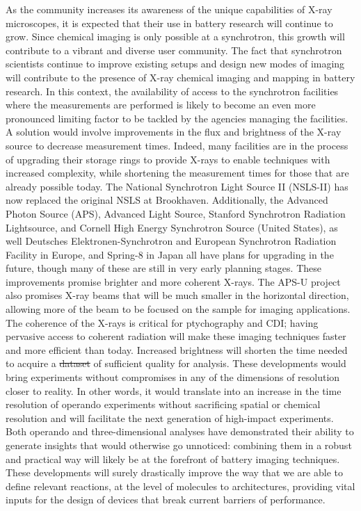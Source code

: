 \documentclass[journal=cmatex,manuscript=perspective]{achemso}
\providecommand{\DIFaddtex}[1]{{\protect\color{blue}\uwave{#1}}} %
\providecommand{\DIFdeltex}[1]{{\protect\color{red}\sout{#1}}}                      %
\providecommand{\DIFaddbegin}{} %
\providecommand{\DIFaddend}{} %
\providecommand{\DIFdelbegin}{} %
\providecommand{\DIFdelend}{} %
\providecommand{\DIFadd}[1]{\texorpdfstring{\DIFaddtex{#1}}{#1}} %
\providecommand{\DIFdel}[1]{\texorpdfstring{\DIFdeltex{#1}}{}} %
\begin{document}
As the community increases its awareness of the unique capabilities of
X-ray microscopes, it is expected that their use in battery research
will continue to grow. Since chemical imaging is only possible at a
synchrotron, this growth will contribute to a vibrant and diverse user
community. The fact that synchrotron scientists continue to improve
existing setups and design new modes of imaging will contribute to the
presence of X-ray chemical imaging and mapping in battery research. In
this context, the availability of access to the synchrotron facilities
where the measurements are performed is likely to become an even more
pronounced limiting factor to be tackled by the agencies managing the
facilities. A solution would involve improvements in the flux and
brightness of the X-ray source to decrease measurement times. Indeed,
many facilities are in the process of upgrading their storage rings to
provide X-rays to enable techniques with increased complexity, while
shortening the measurement times for those that are already possible
today. The National Synchrotron Light Source II (NSLS-II) has now
replaced the original NSLS at Brookhaven. Additionally, the Advanced
Photon Source (APS), Advanced Light Source, Stanford Synchrotron
Radiation Lightsource, and Cornell High Energy Synchrotron Source
(United States), as well Deutsches Elektronen-Synchrotron and European
Synchrotron Radiation Facility in Europe, and Spring-8 in Japan all
have plans for upgrading in the future, though many of these are still
in very early planning stages. These improvements promise brighter and
more coherent X-rays. The APS-U project also promises X-ray beams that
will be much smaller in the horizontal direction, allowing more of the
beam to be focused on the sample for imaging applications. The
coherence of the X-rays is critical for ptychography and CDI; having
pervasive access to coherent radiation will make these imaging
techniques faster and more efficient than today. Increased brightness
will shorten the time needed to acquire a \DIFdelbegin \DIFdel{dataset }\DIFdelend \DIFaddbegin \DIFadd{data-set }\DIFaddend of sufficient
quality for analysis. These developments would bring experiments
without compromises in any of the dimensions of resolution closer to
reality. In other words, it would translate into an increase in the
time resolution of operando experiments without sacrificing spatial or
chemical resolution and will facilitate the next generation of
high-impact experiments. Both operando and three-dimensional analyses
have demonstrated their ability to generate insights that would
otherwise go unnoticed: combining them in a robust and practical way
will likely be at the forefront of battery imaging techniques. These
developments will surely drastically improve the way that we are able
to define relevant reactions, at the level of molecules to
architectures, providing vital inputs for the design of devices that
break current barriers of performance.
\end{document}
